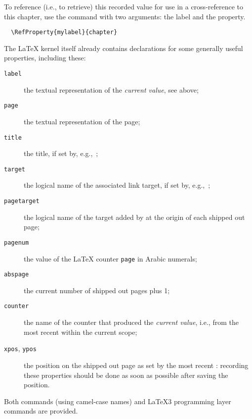 \documentclass{ltnews}
\begin{document}
To reference (i.e., to retrieve)
this recorded value for use in a cross-reference to this chapter, use
the  command with two arguments: the label and the property.
\begin{verbatim}
  \RefProperty{mylabel}{chapter}
\end{verbatim}

The
\LaTeX{} kernel itself already contains
declarations for some generally useful properties,
including these:
\begin{description}
\item[\texttt{label}] the textual representation of the \emph{current \textup{} value}, see above;
\item[\texttt{page}] the textual representation of the page;
\item[\texttt{title}] the title, if set by, e.g.,~;
\item[\texttt{target}] the logical name of the associated link target, if set by,
e.g.,~;
\item[\texttt{pagetarget}] the logical name of the target added
by  at the origin of each shipped out page;
\item[\texttt{pagenum}] the value of the \LaTeX{} counter \texttt{page} in Arabic numerals;
\item[\texttt{abspage}] the current number of shipped out pages plus 1;
\item[\texttt{counter}] the name of the counter that produced the \emph{current \textup{} value}, i.e.,
                  from the most recent  within the current scope;
\item[\texttt{xpos}, \texttt{ypos}] the position on the shipped out page as
set by the most recent : recording these properties should
be done as soon as possible after saving the position.
\end{description}

Both \LaTeXe{} commands (using camel-case names) and
\LaTeX3 programming layer commands are provided.
\end{document}
